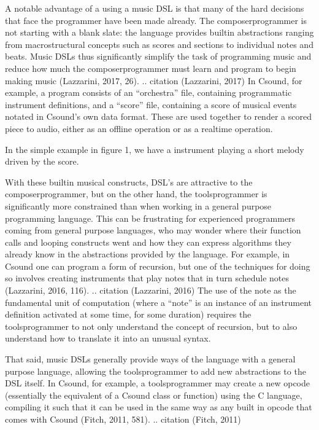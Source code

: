 \documentclass[letterpaper,10pt,english]{sphinxmanual}
\begin{document}
\sphinxAtStartPar
A notable advantage of a using a music DSL is that many of the hard
decisions that face the programmer have been made already.
The composer\sphinxhyphen{}programmer is not starting with a blank slate:
the language provides built\sphinxhyphen{}in abstractions ranging from
macro\sphinxhyphen{}structural concepts such as scores and sections to individual notes and beats.
Music DSLs thus significantly simplify the task of programming music and reduce
how much the composer\sphinxhyphen{}programmer must learn and program to begin making music (Lazzarini, 2017, 26).
.. citation (Lazzarini, 2017)
In Csound, for example, a program consists of an “orchestra” file, containing
programmatic instrument definitions, and a “score” file, containing a score
of musical events notated in Csound’s own data format.
These are used together to render a scored piece to audio,
either as an offline operation or as a realtime operation.

\sphinxAtStartPar
In the simple example in figure 1, we have a instrument playing a
short melody driven by the score.

\sphinxAtStartPar
With these built\sphinxhyphen{}in musical constructs, DSL’s are attractive to the composer\sphinxhyphen{}programmer,
but on the other hand, the tools\sphinxhyphen{}programmer is significantly more constrained than when
working in a general purpose programming language.
This can be frustrating for experienced programmers coming from general purpose languages,
who may wonder where their function calls and looping constructs went and how they can
express algorithms they already know in the abstractions provided by the language.
For example, in Csound one can program a form of recursion, but one of the techniques
for doing so involves creating instruments that play notes that in turn schedule notes (Lazzarini, 2016, 116).
.. citation (Lazzarini, 2016)
The use of the note as the fundamental
unit of computation (where a “note” is an instance of an instrument definition activated at
some time, for some duration) requires the tools\sphinxhyphen{}programmer to not only
understand the concept of recursion, but to also understand how to translate it
into an unusual syntax.

\sphinxAtStartPar
That said, music DSLs generally provide ways of  the language with
a general purpose language, allowing the tools\sphinxhyphen{}programmer to add new abstractions to the DSL itself.
In Csound, for example, a tools\sphinxhyphen{}programmer may create a new opcode (essentially the equivalent
of a Csound class or function) using the C language,
compiling it such that it can be used in the same way as any built in opcode that comes with Csound
(Fitch, 2011, 581).
.. citation (Fitch, 2011)
\end{document}
